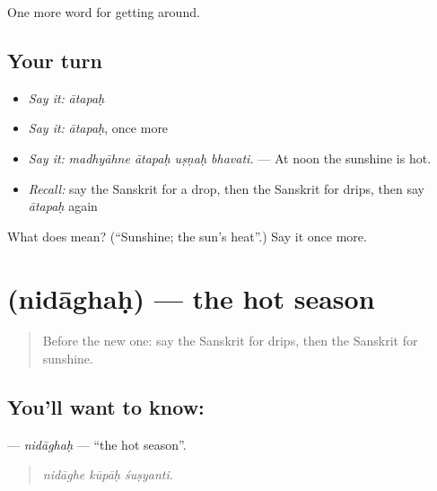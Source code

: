 \begin{grammarlens}[title={What you've built}]
One more word for getting around.
\end{grammarlens}

\subsection*{Your turn}
\begin{itemize}
\raggedright
  \item \emph{Say it:} \emph{ātapaḥ}
  \item \emph{Say it:} \emph{ātapaḥ}, once more
  \item \emph{Say it:} \emph{madhyāhne ātapaḥ uṣṇaḥ bhavati.} — At noon the sunshine is hot.
  \item \emph{Recall:} say the Sanskrit for a drop, then the Sanskrit for drips, then say \emph{ātapaḥ} again
\end{itemize}

\begin{tcolorbox}[breakable,colback=teal!4,colframe=teal!35!black,title={Before you move on}]
What does  mean? (\textquotedblleft{}Sunshine; the sun's heat\textquotedblright{}.) Say it once more.
\end{tcolorbox}
\section[\texorpdfstring{\sk{निदाघः} (nidāghaḥ)}{निदाघः (nidāghaḥ)}]{ (nidāghaḥ) — the hot season}

\label{lesson:SA-C438-nidaghah}



\begin{quote}
Before the new one: say the Sanskrit for drips, then the Sanskrit for sunshine.
\end{quote}

\subsection*{You'll want to know: }
\textbf{} — \emph{nidāghaḥ} — \textquotedblleft{}the hot season\textquotedblright{}.

\begin{quote}
  
\end{quote}

\begin{quote}
\emph{nidāghe kūpāḥ śuṣyanti.}
\end{quote}

